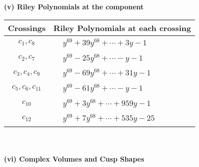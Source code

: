 \documentclass[1p]{elsarticle_modified}
\theoremstyle{definition}
\begin{document}
\newpage\renewcommand{\arraystretch}{1}
\flushleft \textbf{(v) Riley Polynomials at the component}\newline \\
\begin{tabular}{m{50pt}|m{274pt}}
Crossings & \hspace{64pt}Riley Polynomials at each crossing \\
\hline $$\begin{aligned}c_{1},c_{8}\end{aligned}$$&$\begin{aligned}
&y^{69}+39 y^{68}+\cdots+3 y-1
\end{aligned}$\\
\hline $$\begin{aligned}c_{2},c_{7}\end{aligned}$$&$\begin{aligned}
&y^{69}-25 y^{68}+\cdots- y-1
\end{aligned}$\\
\hline $$\begin{aligned}c_{3},c_{4},c_{9}\end{aligned}$$&$\begin{aligned}
&y^{69}-69 y^{68}+\cdots+31 y-1
\end{aligned}$\\
\hline $$\begin{aligned}c_{5},c_{6},c_{11}\end{aligned}$$&$\begin{aligned}
&y^{69}-61 y^{68}+\cdots- y-1
\end{aligned}$\\
\hline $$\begin{aligned}c_{10}\end{aligned}$$&$\begin{aligned}
&y^{69}+3 y^{68}+\cdots+959 y-1
\end{aligned}$\\
\hline $$\begin{aligned}c_{12}\end{aligned}$$&$\begin{aligned}
&y^{69}+7 y^{68}+\cdots+535 y-25
\end{aligned}$\\
\hline
\end{tabular}\\~\\
\newpage\flushleft \textbf{(vi) Complex Volumes and Cusp Shapes}
\end{document}
